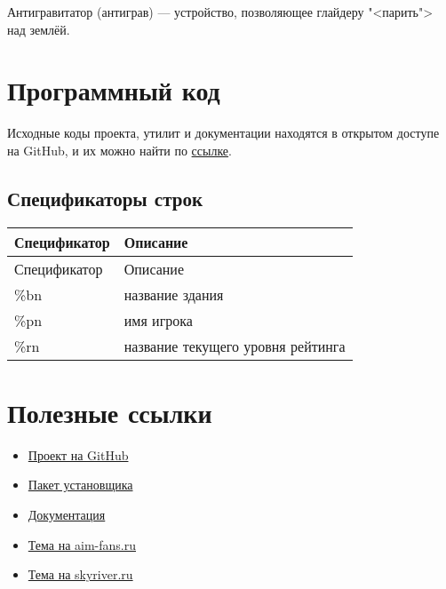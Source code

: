 \documentclass[a4paper,12pt]{report}
\begin{document}
Антигравитатор (антиграв) --- устройство, позволяющее глайдеру "<парить"> над землёй.

\chapter{Программный код}

Исходные коды проекта, утилит и документации находятся в открытом доступе на GitHub, и их можно найти по \href{https://github.com/aimrebirth}{ссылке}.

\section{Спецификаторы строк}

\begin{longtable}{|l|l|}
\hline

Спецификатор & Описание\\ \hline
\endfirsthead

\hline
Спецификатор & Описание\\ \hline
\endhead

\%bn & название здания \\ \hline
\%pn & имя игрока \\ \hline
\%rn & название текущего уровня рейтинга \\ \hline

\end{longtable}

\begin{comment}
\chapter*{Заключение}
\addcontentsline{toc}{chapter}{Заключение}
\end{comment}

\chapter*{Полезные ссылки}

\begin{itemize}
\item \href{https://github.com/aimrebirth}{Проект на GitHub}
\item \href{https://www.dropbox.com/s/0zhbgb1ftspcv9w/polygon4.zip?dl=1}{Пакет установщика}
\item \href{https://www.dropbox.com/s/ipnakg5civ0xp0g/Polygon4_ru.pdf?dl=1}{Документация}
\item \href{http://aim-fans.ru/index.php?showtopic=147}{Тема на aim-fans.ru}
\item \href{http://forum.skyriver.ru/viewtopic.php?f=26&t=4801}{Тема на skyriver.ru}
\end{itemize}
\end{document}
